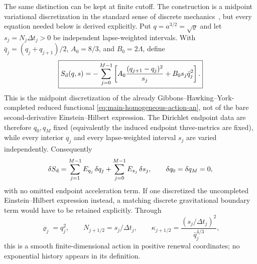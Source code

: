 \documentclass[11pt]{article}
\theoremstyle{definition}
\theoremstyle{remark}
\begin{document}
The same distinction can be kept at finite cutoff.  The construction is a
midpoint variational discretization in the standard sense of discrete
mechanics~\cite{MarsdenWest2001}, but every equation needed below is derived
explicitly.  Put
$q=a^{3/2}=\sqrt\varrho$ and let
$s_j=N_j\Delta t_j>0$ be independent lapse-weighted intervals.  With
$\bar q_j=(q_j+q_{j+1})/2$, $A_0=8/3$, and $B_0=2\Lambda$, define
\begin{equation}
 \boxed{
 S_{\rm d}(q,s)
 =-\sum_{j=0}^{M-1}\left[
 A_0\frac{(q_{j+1}-q_j)^2}{s_j}
 +B_0s_j\bar q_j^2\right].}
 \label{eq:main-discrete-homogeneous-action}
\end{equation}
This is the midpoint discretization of the already
Gibbons--Hawking--York-completed reduced functional
\eqref{eq:main-homogeneous-action-an}, not of the bare second-derivative
Einstein--Hilbert expression.  The Dirichlet endpoint data are therefore
$q_0,q_M$ fixed (equivalently the induced endpoint three-metrics are fixed),
while every interior $q_j$ and every lapse-weighted interval $s_j$ are varied
independently.  Consequently
\begin{equation}
 \delta S_{\rm d}
 =\sum_{j=1}^{M-1}E_{q_j}\,\delta q_j
  +\sum_{j=0}^{M-1}E_{s_j}\,\delta s_j,
 \qquad \delta q_0=\delta q_M=0,
 \label{eq:main-discrete-dirichlet-variation}
\end{equation}
with no omitted endpoint acceleration term.  If one discretized the uncompleted
Einstein--Hilbert expression instead, a matching discrete gravitational boundary
term would have to be retained explicitly.  Through
\begin{equation}
 \varrho_j=q_j^2,\qquad
 N_{j+1/2}=s_j/\Delta t_j,\qquad
 \kappa_{j+1/2}=\frac{(s_j/\Delta t_j)^2}{\bar q_j^{4/3}},
 \label{eq:main-discrete-renewal-map}
\end{equation}
this is a smooth finite-dimensional action in positive renewal coordinates; no
exponential history appears in its definition.
\end{document}
